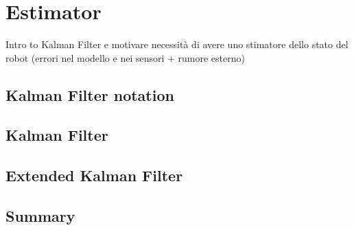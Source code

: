 \chapter{Estimator}
\label{chap:fourth}
\ifpdf
    \graphicspath{{Chapter4/Figures/PNG/}{Chapter4/Figures/PDF/}{Chapter4/Figures/}{Chapter4/Figures/EPS/}}
\else
    \graphicspath{{Chapter4/Figures/EPS/}{Chapter4/Figures/}}
\fi

Intro to Kalman Filter e motivare necessità di avere uno stimatore dello stato del robot (errori nel modello e nei sensori 
+ rumore esterno)
\section{Kalman Filter notation}
\section{Kalman Filter}

\section{Extended Kalman Filter}


\section{Summary}